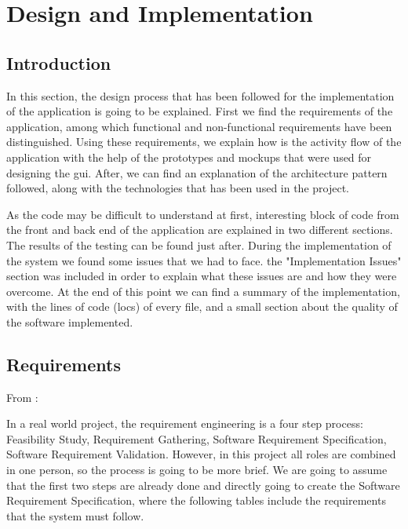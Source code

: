 \chapter{Design and Implementation}
\label{ch:design}

\section{Introduction}
In this section, the design process that has been followed for the implementation of the application is going to be explained. First we find the requirements of the application, among which functional and non-functional requirements have been distinguished. Using these requirements, we explain how is the activity flow of the application with the help of the prototypes and mockups that were used for designing the \gls{gui}. After, we can find an explanation of the architecture pattern followed, along with the technologies that has been used in the project. 

As the code may be difficult to understand at first, interesting block of code from the front and back end of the application are explained in two different sections. The results of the testing can be found just after. During the implementation of the system we found some issues that we had to face. the "Implementation Issues" section was included in order to explain what these issues are and how they were overcome. At the end of this point we can find a summary of the implementation, with the lines of code (\glspl{loc}) of every file, and a small section about the quality of the software implemented.  

\section{Requirements}
\label{sec:requirements}
From \cite{req_engineering_def}:


In a real world project, the requirement engineering is a four step process: Feasibility Study, Requirement Gathering, Software Requirement Specification, Software Requirement Validation. However, in this project all roles are combined in one person, so the process is going to be more brief. We are going to assume that the first two steps are already done and directly going to create the Software Requirement Specification, where the following tables include the requirements that the system must follow.

